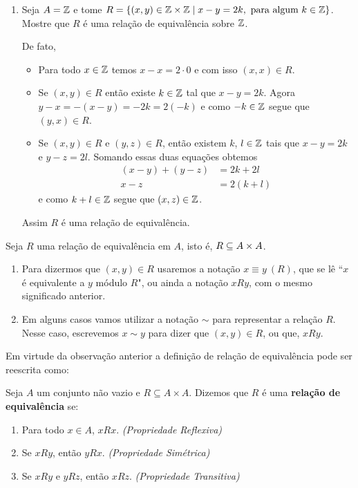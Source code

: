 \begin{exemplos}
\begin{enumerate}[label={\arabic*})]
        \item Seja $A = \mathbb{Z}$ e tome $R = \{(x,y)\in \mathbb{Z} \times \mathbb{Z} \mid x - y = 2k, \mbox{ para algum } k \in \mathbb{Z}\}$. Mostre que $R$
        é uma relação de equivalência sobre $\mathbb{Z}$.
        \begin{solucao}
            De fato,
            \begin{itemize}
                \item Para todo $x\in\mathbb{Z}$ temos $x - x = 2\cdot0$ e com isso $(x,x) \in R$.
                \item Se $(x,y) \in R$ então existe $k \in \mathbb{Z}$ tal que $x - y = 2k$. Agora $y - x = -(x - y) = -2k = 2 (-k)$
                e como $-k \in \mathbb{Z}$ segue que $(y,x) \in R$.
                \item Se $(x,y) \in R$ e $(y,z) \in R$, então existem $k$, $l\in \mathbb{Z}$ tais que $x - y = 2k$ e $y - z = 2l$.
                Somando essas duas equações obtemos
                \begin{align*}
                    (x - y) + (y - z) &= 2k + 2l\\
                    x - z &= 2(k + l)
                \end{align*}
                e como $k + l \in \mathbb{Z}$ segue que $(x,z) \in \mathbb{Z}$.
            \end{itemize}
            Assim $R$ é uma relação de equivalência.
        \end{solucao}
    \end{enumerate}
\end{exemplos}
\begin{observacoes}
    Seja $R$ uma relação de equivalência em $A$, isto é, $R \subseteq A \times A$.
    \begin{enumerate}[label={\arabic*})]
        \item  Para dizermos que $(x,y) \in R$ usaremos a notação $x\equiv y\ (R)$, que se lê ``$x$ é equivalente a $y$ módulo $R$", ou ainda a notação $xRy$, com o mesmo significado anterior.
        \item Em alguns casos vamos utilizar a notação $\sim$ para representar a relação $R$. Nesse caso, escrevemos $x \sim y$ para dizer que $(x, y) \in R$, ou que, $xRy$.
    \end{enumerate}
\end{observacoes}

Em virtude da observação anterior a definição de relação de equivalência pode ser reescrita como:

\begin{definicao}
    Seja $A$ um conjunto não vazio e $R\subseteq A \times A$. Dizemos que $R$ é uma \textbf{relação de equivalência} se:
    \begin{enumerate}[label={\roman*})]
        \item Para todo $x \in A$, $xRx$. \textit{(Propriedade Reflexiva)}
        \item Se $xRy$, então $yRx$. \textit{(Propriedade Simétrica)}
        \item Se $xRy$ e $yRz$, então $xRz$. \textit{(Propriedade Transitiva)}
    \end{enumerate}
\end{definicao}

